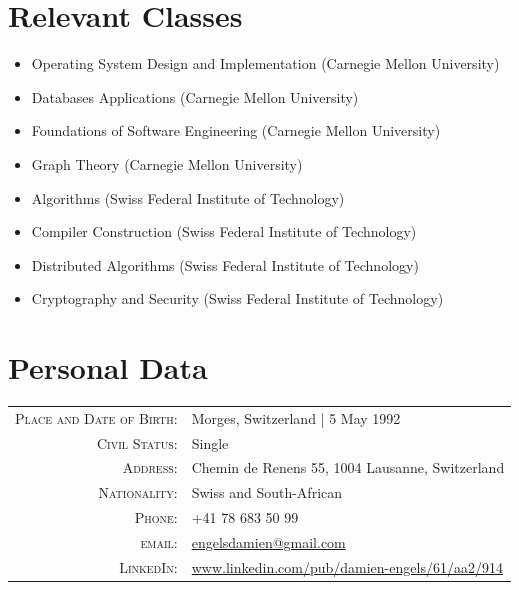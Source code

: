 \documentclass[a4paper,11pt]{article} %
\begin{document}

\section{Relevant Classes}
\begin{center}
\begin{itemize}
\item Operating System Design and Implementation (Carnegie Mellon University) 
\item Databases Applications (Carnegie Mellon University)
\item Foundations of Software Engineering (Carnegie Mellon University)
\item Graph Theory (Carnegie Mellon University)
\item Algorithms (Swiss Federal Institute of Technology)
\item Compiler Construction (Swiss Federal Institute of Technology)
\item Distributed Algorithms (Swiss Federal Institute of Technology)
\item Cryptography and Security (Swiss Federal Institute of Technology)
\end{itemize}
\end{center}



\section{Personal Data}
\begin{center}
\begin{tabular}{rl}
\textsc{Place and Date of Birth:} & Morges, Switzerland  | 5 May 1992 \\
\textsc{Civil Status:} & Single \\
\textsc{Address:} & Chemin de Renens 55, 1004 Lausanne, Switzerland \\
\textsc{Nationality:} & Swiss and South-African \\
\textsc{Phone:} & +41 78 683 50 99\\
\textsc{email:} & \href{mailto:engelsdamien@gmail.com}{engelsdamien@gmail.com}\\
\textsc{LinkedIn:} &
\href{http://www.linkedin.com/pub/damien-engels/61/aa2/914}{www.linkedin.com/pub/damien-engels/61/aa2/914}
\end{tabular}
\end{center}
\end{document}
